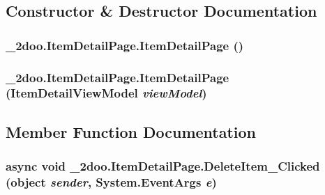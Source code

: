 \subsection{Constructor \& Destructor Documentation}
\hypertarget{class__2doo_1_1_item_detail_page_f9128dbdf514d34545281a147fbe0d2f}{
\subsubsection[{ItemDetailPage}]{\setlength{\rightskip}{0pt plus 5cm}\_\-2doo.ItemDetailPage.ItemDetailPage ()}}
\label{class__2doo_1_1_item_detail_page_f9128dbdf514d34545281a147fbe0d2f}


\hypertarget{class__2doo_1_1_item_detail_page_25701813c6a3d5ffa7b91d012b3084c1}{
\subsubsection[{ItemDetailPage}]{\setlength{\rightskip}{0pt plus 5cm}\_\-2doo.ItemDetailPage.ItemDetailPage ({\bf ItemDetailViewModel} {\em viewModel})}}
\label{class__2doo_1_1_item_detail_page_25701813c6a3d5ffa7b91d012b3084c1}




\subsection{Member Function Documentation}
\hypertarget{class__2doo_1_1_item_detail_page_075dd61572948253c0a396b343813395}{
\subsubsection[{DeleteItem\_\-Clicked}]{\setlength{\rightskip}{0pt plus 5cm}async void \_\-2doo.ItemDetailPage.DeleteItem\_\-Clicked (object {\em sender}, \/  System.EventArgs {\em e})}}
\label{class__2doo_1_1_item_detail_page_075dd61572948253c0a396b343813395}


